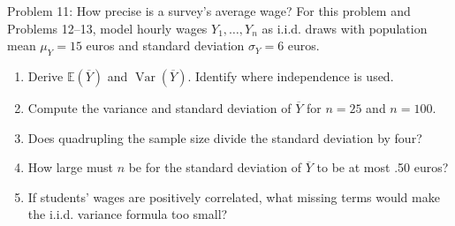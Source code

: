 \documentclass[notes,10pt, aspectratio=169]{beamer}
\newcommand{\E}{\mathbb{E}}
\newcommand{\Var}{\operatorname{Var}}
\begin{document}
\begin{frame}{Problem 11: How precise is a survey's average wage?}
For this problem and Problems 12--13, model hourly wages $Y_1,\ldots,Y_n$ as i.i.d. draws with population mean $\mu_Y=15$ euros and standard deviation $\sigma_Y=6$ euros.
\begin{enumerate}
\setlength{\itemsep}{8pt}
\item Derive $\E(\overline Y)$ and $\Var(\overline Y)$. Identify where independence is used.
\item Compute the variance and standard deviation of $\overline Y$ for $n=25$ and $n=100$.
\item Does quadrupling the sample size divide the standard deviation by four?
\item How large must $n$ be for the standard deviation of $\overline Y$ to be at most .50 euros?
\item If students' wages are positively correlated, what missing terms would make the i.i.d. variance formula too small?
\end{enumerate}
\end{frame}
\end{document}
